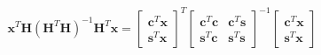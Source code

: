 \begin{equation}
\boldsymbol{x}^{T} \boldsymbol{H}\left(\boldsymbol{H}^{T} \boldsymbol{H}\right)^{-1} \boldsymbol{H}^{T} \boldsymbol{x}=\left[\begin{array}{c}
\boldsymbol{c}^{T} \boldsymbol{x} \\
\boldsymbol{s}^{T} \boldsymbol{x}
\end{array}\right]^{T}\left[\begin{array}{cc}
\boldsymbol{c}^{T} \boldsymbol{c} & \boldsymbol{c}^{T} \boldsymbol{s} \\
\boldsymbol{s}^{T} \boldsymbol{c} & \boldsymbol{s}^{T} \boldsymbol{s}
\end{array}\right]^{-1}\left[\begin{array}{c}
\boldsymbol{c}^{T} \boldsymbol{x} \\
\boldsymbol{s}^{T} \boldsymbol{x}
\end{array}\right]
\label{eqn:ch5final}
\end{equation}